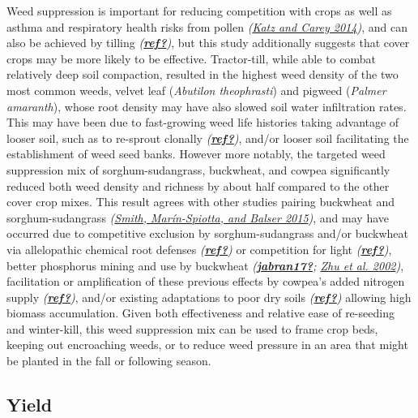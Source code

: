 \documentclass[
]{article}
\begin{document}
Weed suppression is important for reducing competition with crops as well as asthma and respiratory health risks from pollen \emph{(\protect\hyperlink{ref-katz14}{Katz and Carey 2014})}, and can also be achieved by tilling \emph{(\protect\hyperlink{ref-ref}{\textbf{ref?}})}, but this study additionally suggests that cover crops may be more likely to be effective.
Tractor-till, while able to combat relatively deep soil compaction, resulted in the highest weed density of the two most common weeds, velvet leaf (\emph{Abutilon theophrasti}) and pigweed (\emph{Palmer amaranth}), whose root density may have also slowed soil water infiltration rates.
This may have been due to fast-growing weed life histories taking advantage of looser soil, such as to re-sprout clonally \emph{(\protect\hyperlink{ref-ref}{\textbf{ref?}})}, and/or looser soil facilitating the establishment of weed seed banks.
However more notably, the targeted weed suppression mix of sorghum-sudangrass, buckwheat, and cowpea significantly reduced both weed density and richness by about half compared to the other cover crop mixes.
This result agrees with other studies pairing buckwheat and sorghum-sudangrass \emph{(\protect\hyperlink{ref-smith15}{Smith, Marín-Spiotta, and Balser 2015})}, and may have occurred due to competitive exclusion by sorghum-sudangrass and/or buckwheat via allelopathic chemical root defenses \emph{(\protect\hyperlink{ref-ref}{\textbf{ref?}})} or competition for light \emph{(\protect\hyperlink{ref-ref}{\textbf{ref?}})}, better phosphorus mining and use by buckwheat \emph{(\protect\hyperlink{ref-jabran17}{\textbf{jabran17?}}; \protect\hyperlink{ref-zhu02}{Zhu et al. 2002})}, facilitation or amplification of these previous effects by cowpea's added nitrogen supply \emph{(\protect\hyperlink{ref-ref}{\textbf{ref?}})}, and/or existing adaptations to poor dry soils \emph{(\protect\hyperlink{ref-ref}{\textbf{ref?}})} allowing high biomass accumulation.
Given both effectiveness and relative ease of re-seeding and winter-kill, this weed suppression mix can be used to frame crop beds, keeping out encroaching weeds, or to reduce weed pressure in an area that might be planted in the fall or following season.

\hypertarget{yield-2}{%
\subsection{Yield}\label{yield-2}}
\end{document}
